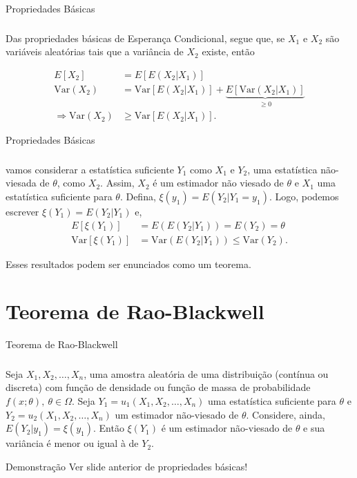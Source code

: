 \documentclass[12pt]{beamer}
\begin{document}
\begin{frame}{Propriedades Básicas}
\frametitle{}
\begin{block}{}
\justifying
Das propriedades básicas de Esperança Condicional, segue que, se $X_1$ e $X_2$ são variáveis aleatórias tais que a variância de $X_2$ existe, então

\begin{align*}
E[X_2] &= E[E(X_2|X_1)] \\
\text{Var}(X_2) &= \text{Var}[E(X_2|X_1)]+\underbrace{E[\text{Var}(X_2|X_1)]}_{\geq 0}\\
\Rightarrow \text{Var}(X_2) &\geq \text{Var}[E(X_2|X_1)].
\end{align*}
\end{block}
\end{frame}

\begin{frame}{Propriedades Básicas}
\frametitle{}
\begin{block}{}
\justifying
vamos considerar a estatística suficiente $Y_1$ como $X_1$ e $Y_2$, uma estatística não-viesada de $\theta$, como $X_2$. Assim, $X_2$ é um estimador não viesado de $\theta$ e $X_1$ uma estatística suficiente para $\theta$. Defina, $\xi(y_{1})=E(Y_2|Y_1=y_1).$ Logo, podemos escrever $\xi(Y_{1})=E(Y_2|Y_1)$ e,
\begin{align*}
 E[\xi(Y_1)]&= E(E(Y_2|Y_1))=E(Y_2) = \theta \\
\text{Var}[\xi(Y_1)]&=\text{Var}(E(Y_2|Y_1)) \leq \text{Var}(Y_2).
\end{align*}

Esses resultados podem ser enunciados como um teorema.
\end{block}
\end{frame}

\section{Teorema de Rao-Blackwell}
\begin{frame}{Teorema de Rao-Blackwell}
\frametitle{}
\begin{Teorema}
\justifying
Seja $X_1, X_2, \ldots, X_n$, uma amostra aleatória de uma distribuição (contínua ou discreta) com função de densidade ou função de massa de probabilidade $f(x; \theta),~\theta \in \Omega$. Seja $Y_1 = u_1(X_1, X_2, \ldots, X_n)$ uma estatística suficiente para $\theta$ e $Y_2 = u_2(X_1, X_2, \ldots, X_n)$ um estimador não-viesado de $\theta$. Considere, ainda, $E(Y_2|y_1) = \xi(y_1).$ Então $\xi(Y_1)$ é um estimador não-viesado de $\theta$ e sua variância é menor ou igual à de $Y_2$.
\end{Teorema}
\pause
\begin{block}{Demonstração}
\justifying
Ver slide anterior de propriedades básicas!
\end{block}
\end{frame}
\end{document}
